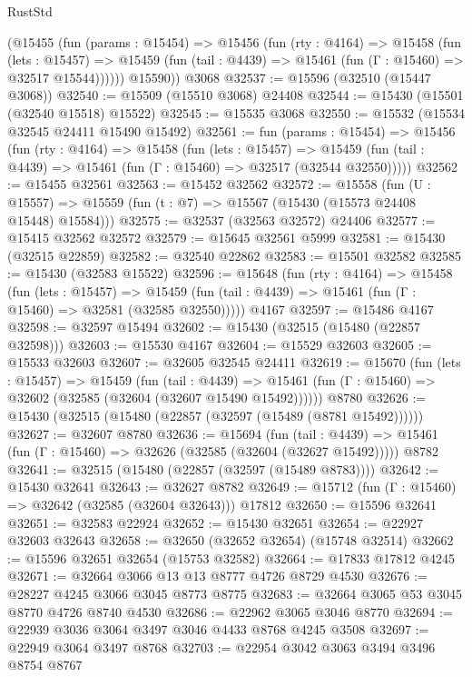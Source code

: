 \begin{lexlean}{RustStd}
\begin{coremodule}
        (@15455
          (fun (params : @15454) =>
          @15456
            (fun (rty : @4164) =>
            @15458
              (fun (lets : @15457) =>
              @15459 (fun (tail : @4439) => @15461 (fun (Γ : @15460) => @32517 @15544))))))
        @15590))
    @3068
@32537 := @15596 (@32510 (@15447 @3068))
@32540 := @15509 (@15510 @3068) @24408
@32544 := @15430 (@15501 (@32540 @15518) @15522)
@32545 := @15535 @3068
@32550 := @15532 (@15534 @32545 @24411 @15490 @15492)
@32561 := fun (params : @15454) =>
  @15456
    (fun (rty : @4164) =>
    @15458
      (fun (lets : @15457) =>
      @15459 (fun (tail : @4439) => @15461 (fun (Γ : @15460) => @32517 (@32544 @32550)))))
@32562 := @15455 @32561
@32563 := @15452 @32562
@32572 := @15558
    (fun (U : @15557) => @15559 (fun (t : @7) => @15567 (@15430 (@15573 @24408 @15448) @15584)))
@32575 := @32537 (@32563 @32572) @24406
@32577 := @15415 @32562 @32572
@32579 := @15645 @32561 @5999
@32581 := @15430 (@32515 @22859)
@32582 := @32540 @22862
@32583 := @15501 @32582
@32585 := @15430 (@32583 @15522)
@32596 := @15648
    (fun (rty : @4164) =>
    @15458
      (fun (lets : @15457) =>
      @15459 (fun (tail : @4439) => @15461 (fun (Γ : @15460) => @32581 (@32585 @32550)))))
    @4167
@32597 := @15486 @4167
@32598 := @32597 @15494
@32602 := @15430 (@32515 (@15480 (@22857 @32598)))
@32603 := @15530 @4167
@32604 := @15529 @32603
@32605 := @15533 @32603
@32607 := @32605 @32545 @24411
@32619 := @15670
    (fun (lets : @15457) =>
    @15459
      (fun (tail : @4439) =>
      @15461 (fun (Γ : @15460) => @32602 (@32585 (@32604 (@32607 @15490 @15492))))))
    @8780
@32626 := @15430 (@32515 (@15480 (@22857 (@32597 (@15489 (@8781 @15492))))))
@32627 := @32607 @8780
@32636 := @15694
    (fun (tail : @4439) => @15461 (fun (Γ : @15460) => @32626 (@32585 (@32604 (@32627 @15492)))))
    @8782
@32641 := @32515 (@15480 (@22857 (@32597 (@15489 @8783))))
@32642 := @15430 @32641
@32643 := @32627 @8782
@32649 := @15712 (fun (Γ : @15460) => @32642 (@32585 (@32604 @32643))) @17812
@32650 := @15596 @32641
@32651 := @32583 @22924
@32652 := @15430 @32651
@32654 := @22927 @32603 @32643
@32658 := @32650 (@32652 @32654) (@15748 @32514)
@32662 := @15596 @32651 @32654 (@15753 @32582)
@32664 := @17833 @17812 @4245
@32671 := @32664 @3066 @13 @13 @8777 @4726 @8729 @4530
@32676 := @28227 @4245 @3066 @3045 @8773 @8775
@32683 := @32664 @3065 @53 @3045 @8770 @4726 @8740 @4530
@32686 := @22962 @3065 @3046 @8770
@32694 := @22939 @3036 @3064 @3497 @3046 @4433 @8768 @4245 @3508
@32697 := @22949 @3064 @3497 @8768
@32703 := @22954 @3042 @3063 @3494 @3496 @8754 @8767

\end{coremodule}
\end{lexlean}
